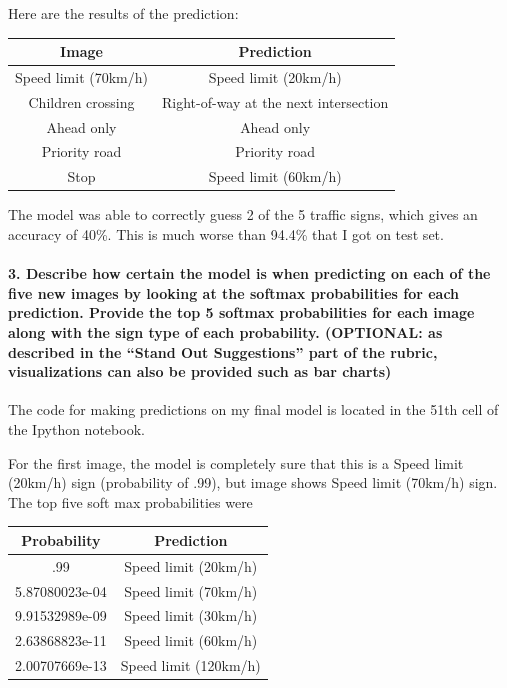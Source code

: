 \documentclass[11pt]{article}
\begin{document}
Here are the results of the prediction:

\begin{longtable}[]{@{}cc@{}}
\toprule
Image & Prediction\tabularnewline
\midrule
\endhead
Speed limit (70km/h) & Speed limit (20km/h)\tabularnewline
Children crossing & Right-of-way at the next intersection\tabularnewline
Ahead only & Ahead only\tabularnewline
Priority road & Priority road\tabularnewline
Stop & Speed limit (60km/h)\tabularnewline
\bottomrule
\end{longtable}

The model was able to correctly guess 2 of the 5 traffic signs, which
gives an accuracy of 40\%. This is much worse than 94.4\% that I got on
test set.

    \hypertarget{describe-how-certain-the-model-is-when-predicting-on-each-of-the-five-new-images-by-looking-at-the-softmax-probabilities-for-each-prediction.-provide-the-top-5-softmax-probabilities-for-each-image-along-with-the-sign-type-of-each-probability.-optional-as-described-in-the-stand-out-suggestions-part-of-the-rubric-visualizations-can-also-be-provided-such-as-bar-charts}{%
\paragraph{3. Describe how certain the model is when predicting on each
of the five new images by looking at the softmax probabilities for each
prediction. Provide the top 5 softmax probabilities for each image along
with the sign type of each probability. (OPTIONAL: as described in the
``Stand Out Suggestions'' part of the rubric, visualizations can also be
provided such as bar
charts)}\label{describe-how-certain-the-model-is-when-predicting-on-each-of-the-five-new-images-by-looking-at-the-softmax-probabilities-for-each-prediction.-provide-the-top-5-softmax-probabilities-for-each-image-along-with-the-sign-type-of-each-probability.-optional-as-described-in-the-stand-out-suggestions-part-of-the-rubric-visualizations-can-also-be-provided-such-as-bar-charts}}

The code for making predictions on my final model is located in the 51th
cell of the Ipython notebook.

For the first image, the model is completely sure that this is a Speed
limit (20km/h) sign (probability of .99), but image shows Speed limit
(70km/h) sign. The top five soft max probabilities were

\begin{longtable}[]{@{}cc@{}}
\toprule
Probability & Prediction\tabularnewline
\midrule
\endhead
.99 & Speed limit (20km/h)\tabularnewline
5.87080023e-04 & Speed limit (70km/h)\tabularnewline
9.91532989e-09 & Speed limit (30km/h)\tabularnewline
2.63868823e-11 & Speed limit (60km/h)\tabularnewline
2.00707669e-13 & Speed limit (120km/h)\tabularnewline
\bottomrule
\end{longtable}
\end{document}
